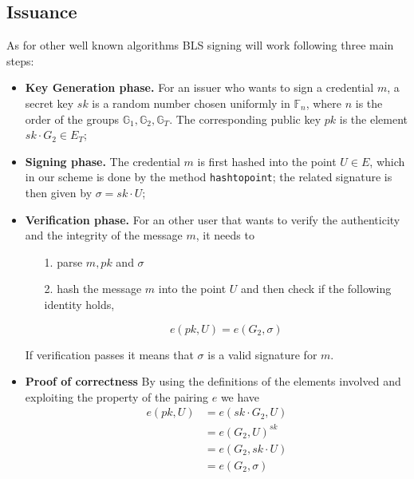 \documentclass[conference]{IEEEtran}
\begin{document}
\subsection{Issuance} \label{issuance}

As for other well known algorithms BLS signing will work following
three main steps:
\begin{itemize}

\item \textbf{Key Generation phase.} For an issuer who wants to sign
  a credential $m$, a secret key $sk$ is a random number chosen
  uniformly in $\mathbb{F}_n$, where $n$ is the order of the
  groups $\mathbb{G}_1, \mathbb{G}_2, \mathbb{G}_T$. The
  corresponding public key $pk$ is the element $sk\cdot G_2\in
  E_T$;

\item \textbf{Signing phase.} The credential $m$ is first hashed into
  the point $U\in E$, which in our scheme is done by the method
  \verb!hashtopoint!; the related signature is then given by $\sigma =
  sk\cdot U$;

\item \textbf{Verification phase.} For an other user that wants to
  verify the authenticity and the integrity of the message $m$, it
  needs to

  \begin{itemize}

  \item [1.] parse $m, pk$ and $\sigma$

  \item [2.] hash the message $m$ into the point $U$ and then
    check if the following identity holds,

    \[
    e(pk,U) = e(G_2,\sigma)
    \]

  \end{itemize}
If verification passes it means that $\sigma$ is a valid signature for
$m$.
\item \textbf{Proof of correctness} By using the definitions of the elements involved and exploiting the property of the pairing $e$ we have
\[
\begin{split}
    e(pk,U) &= e(sk\cdot G_2, U) \\
            &= e(G_2,U)^{sk}\\
            &= e(G_2,sk\cdot U)\\
            &= e(G_2,\sigma)
\end{split}
\]

\end{itemize}
\end{document}

